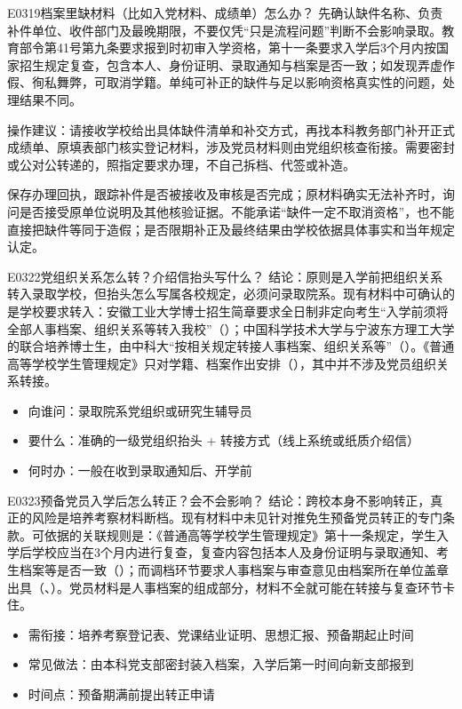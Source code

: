 \begin{qa}{E0319}{档案里缺材料（比如入党材料、成绩单）怎么办？}
先确认缺件名称、负责补件单位、收件部门及最晚期限，不要仅凭“只是流程问题”判断不会影响录取。教育部令第41号第九条要求报到时初审入学资格，第十一条要求入学后3个月内按国家招生规定复查，包含本人、身份证明、录取通知与档案是否一致；如发现弄虚作假、徇私舞弊，可取消学籍。单纯可补正的缺件与足以影响资格真实性的问题，处理结果不同。

操作建议：请接收学校给出具体缺件清单和补交方式，再找本科教务部门补开正式成绩单、原填表部门核实登记材料，涉及党员材料则由党组织核查衔接。需要密封或公对公转递的，照指定要求办理，不自己拆档、代签或补造。

保存办理回执，跟踪补件是否被接收及审核是否完成；原材料确实无法补齐时，询问是否接受原单位说明及其他核验证据。不能承诺“缺件一定不取消资格”，也不能直接把缺件等同于造假；是否限期补正及最终结果由学校依据具体事实和当年规定认定。
\end{qa}

\begin{qa}{E0322}{党组织关系怎么转？介绍信抬头写什么？}
结论：原则是入学前把组织关系转入录取学校，但抬头怎么写属各校规定，必须问录取院系。现有材料中可确认的是学校要求转入：安徽工业大学博士招生简章要求全日制非定向考生“入学前须将全部人事档案、组织关系等转入我校”（）；中国科学技术大学与宁波东方理工大学的联合培养博士生，由中科大“按相关规定转接人事档案、组织关系等”（）。《普通高等学校学生管理规定》只对学籍、档案作出安排（），其中并不涉及党员组织关系转接。

\begin{itemize}
  \item 向谁问：录取院系党组织或研究生辅导员
  \item 要什么：准确的一级党组织抬头 + 转接方式（线上系统或纸质介绍信）
  \item 何时办：一般在收到录取通知后、开学前
\end{itemize}
\end{qa}

\begin{qa}{E0323}{预备党员入学后怎么转正？会不会影响？}
结论：跨校本身不影响转正，真正的风险是培养考察材料断档。现有材料中未见针对推免生预备党员转正的专门条款。可依据的关联规则是：《普通高等学校学生管理规定》第十一条规定，学生入学后学校应当在3个月内进行复查，复查内容包括本人及身份证明与录取通知、考生档案等是否一致（）；而调档环节要求人事档案与审查意见由档案所在单位盖章出具（、）。党员材料是人事档案的组成部分，材料不全就可能在转接与复查环节卡住。

\begin{itemize}
  \item 需衔接：培养考察登记表、党课结业证明、思想汇报、预备期起止时间
  \item 常见做法：由本科党支部密封装入档案，入学后第一时间向新支部报到
  \item 时间点：预备期满前提出转正申请
\end{itemize}
\end{qa}

